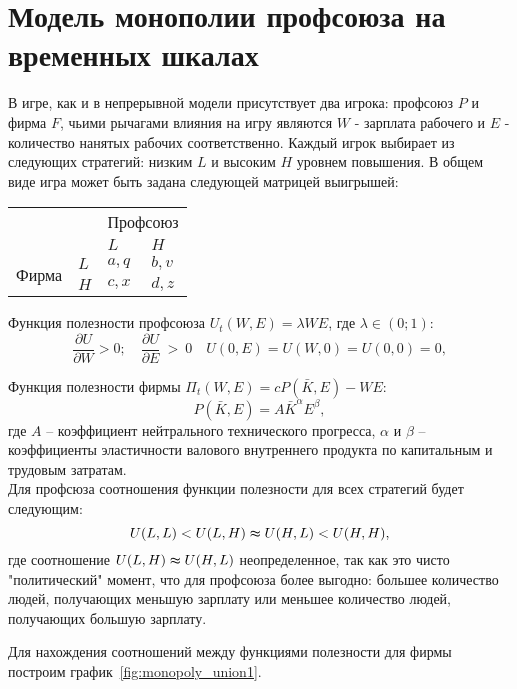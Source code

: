 \section{Модель монополии профсоюза на временных шкалах}

В игре, как и в непрерывной модели присутствует два игрока: профсоюз $P$ и фирма $F$, чьими рычагами влияния на игру являются $W$ - зарплата рабочего и $E$ - количество нанятых рабочих соответственно.
Каждый игрок выбирает из следующих стратегий: низким $L$ и высоким $H$ уровнем повышения. В общем виде игра может быть задана следующей матрицей выигрышей: 

\begin{table}[h]
	\centering
	\begin{tabular}{|l|l|l|l|}
		\hline
		\multicolumn{2}{|l|}{\multirow{2}{*}{}} & \multicolumn{2}{l|}{Профсоюз} \\ \cline{3-4} 
		\multicolumn{2}{|l|}{}                  & $L$            & $H$            \\ \hline
		\multirow{2}{*}{Фирма}     & $L$     & $a,q$          & $b,v$          \\ \cline{2-4} 
		& $H$     & $c,x$          & $d,z$          \\ \hline
	\end{tabular}
\end{table}
Функция полезности профсоюза  $U_t(W,E)=\lambda WE$, где $\lambda \in(0;1)$:
$$\frac{\partial U}{\partial W} > 0; \quad \frac{\partial U}{\partial E}~>~0 \quad U(0,E)=U(W,0)=U(0,0)=0,$$


Функция полезности фирмы $\Pi_t(W,E)=cP(\bar{K},E)-WE$:
$$P(\bar{K}, E)=A\bar{K}^\alpha E^\beta,$$ где $A$ – коэффициент нейтрального технического прогресса, $\alpha$ и $\beta$ – коэффициенты эластичности валового внутреннего продукта по капитальным и трудовым затратам.\\

Для профсюза соотношения функции полезности для всех стратегий будет следующим:
\begin{equation}
U(L,L) < U(L,H) \thickapprox U(H, L) < U(H,H),
\end{equation}
где соотношение $U(L,H) \thickapprox U(H, L)$ неопределенное, так как это чисто "политический" момент, что для профсоюза более выгодно: большее количество людей, получающих меньшую зарплату или меньшее количество людей, получающих большую зарплату. 

Для нахождения соотношений между функциями полезности для фирмы построим график~\ref{fig:monopoly_union1}.\\

